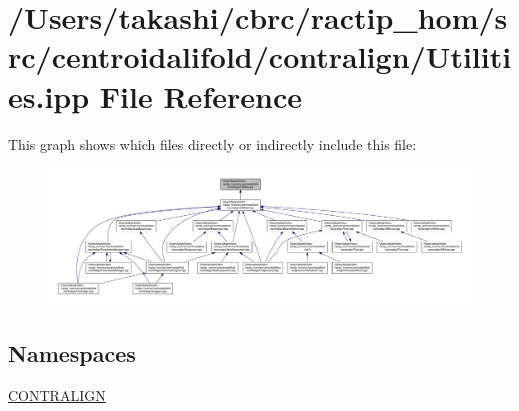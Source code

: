 \hypertarget{centroidalifold_2contralign_2_utilities_8ipp}{\section{/\+Users/takashi/cbrc/ractip\+\_\+hom/src/centroidalifold/contralign/\+Utilities.ipp File Reference}
\label{centroidalifold_2contralign_2_utilities_8ipp}
}
This graph shows which files directly or indirectly include this file\+:
\nopagebreak
\begin{figure}[H]
\begin{center}
\leavevmode
\includegraphics[width=350pt]{centroidalifold_2contralign_2_utilities_8ipp__dep__incl}
\end{center}
\end{figure}
\subsection*{Namespaces}
\begin{DoxyCompactItemize}
\item 
 \hyperlink{namespace_c_o_n_t_r_a_l_i_g_n}{C\+O\+N\+T\+R\+A\+L\+I\+G\+N}
\end{DoxyCompactItemize}

